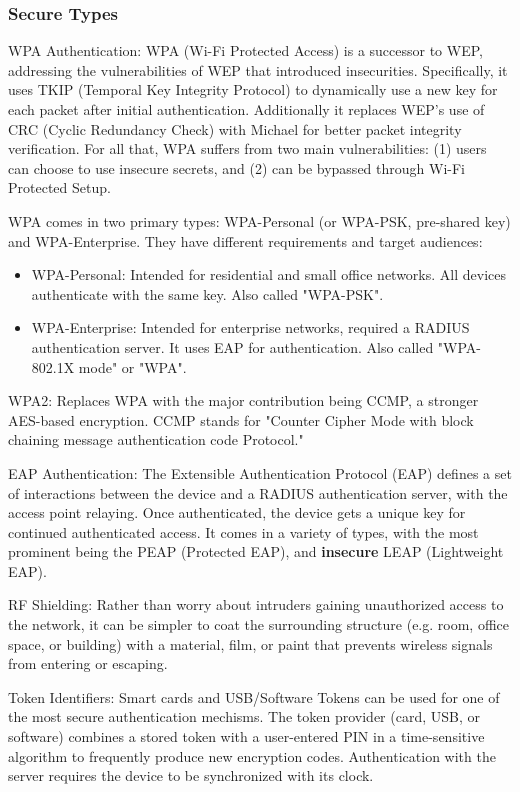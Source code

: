 \subsubsection{Secure Types}
\begin{description}
\item{WPA Authentication:} WPA (Wi-Fi Protected Access) is a successor to WEP, addressing the
vulnerabilities of WEP that introduced insecurities. Specifically, it uses TKIP (Temporal Key
Integrity Protocol) to dynamically use a new key for each packet after initial authentication.
Additionally it replaces WEP's use of CRC (Cyclic Redundancy Check) with Michael for better packet
integrity verification. For all that, WPA suffers from two main vulnerabilities: (1) users can
choose to use insecure secrets, and (2) can be bypassed through Wi-Fi Protected Setup.

WPA comes in two primary types: WPA-Personal (or WPA-PSK, pre-shared key) and WPA-Enterprise. They
have different requirements and target audiences: \cite{wiki:WPA}
\begin{itemize}
\item{WPA-Personal:} Intended for residential and small office networks. All devices authenticate
with the same key. Also called "WPA-PSK".
\item{WPA-Enterprise:} Intended for enterprise networks, required a RADIUS authentication server.
It uses EAP for authentication. Also called "WPA-802.1X mode" or "WPA".
\end{itemize}

\item{WPA2:} Replaces WPA with the major contribution being CCMP, a stronger AES-based encryption.
CCMP stands for "Counter Cipher Mode with block chaining message authentication code Protocol."

\item{EAP Authentication:} The Extensible Authentication Protocol (EAP) defines a set of
interactions between the device and a RADIUS authentication server, with the access point
relaying. Once authenticated, the device gets a unique key for continued authenticated access. It
comes in a variety of types, with the most prominent being the PEAP (Protected EAP), and
\textbf{insecure} LEAP (Lightweight EAP).

\item{RF Shielding:} Rather than worry about intruders gaining unauthorized access to the network,
it can be simpler to coat the surrounding structure (e.g. room, office space, or building) with
a material, film, or paint that prevents wireless signals from entering or escaping.

\item{Token Identifiers:} Smart cards and USB/Software Tokens can be used for one of the most
secure authentication mechisms. The token provider (card, USB, or software) combines a stored
token with a user-entered PIN in a time-sensitive algorithm to frequently produce new encryption
codes. Authentication with the server requires the device to be synchronized with its clock.
\end{description}

